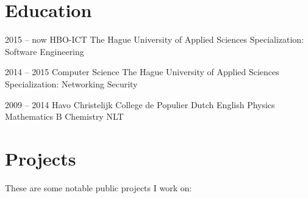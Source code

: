 \documentclass[]{cv-timvisee}
\begin{document}

\section{Education}

\begin{entrylist}

\entry
{2015 -- now}
{HBO-ICT}
{The Hague University of Applied Sciences}
{Specialization: Software Engineering}

\entry
{2014 -- 2015}
{Computer Science}
{The Hague University of Applied Sciences}
{Specialization: Networking \textperiodcentered{} Security}

\entry
{2009 -- 2014}
{Havo}
{Christelijk College de Populier}
{Dutch \textperiodcentered{} English \textperiodcentered{} Physics \textperiodcentered{} Mathematics B \textperiodcentered{} Chemistry \textperiodcentered{} NLT}

\end{entrylist}


\section{Projects}

These are some notable public projects I work on:
\end{document}
